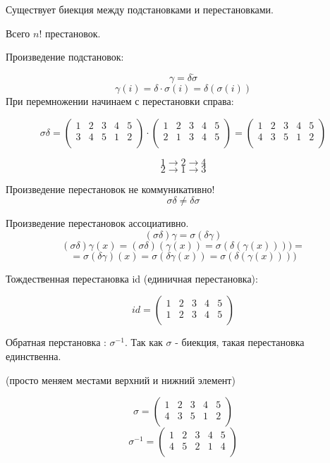 \documentclass[a4paper]{article}
\begin{document}
Существует биекция между подстановками и перестановками.

Всего $n!$ престановок.


Произведение подстановок:

$$ \gamma = \delta \dot \sigma$$
$$ \gamma(i) = \delta \cdot \sigma(i) = \delta ( \sigma(i))$$
При перемножении начинаем с перестановки справа:

\begin{equation*}
\sigma \delta= 
\begin{pmatrix}
	1 & 2 &3 & 4 & 5\\
	3 & 4 & 5 & 1 & 2\\	
\end{pmatrix}
\cdot
\begin{pmatrix}
	1 & 2 &3 & 4 & 5\\
	2 & 1 &3 & 4 & 5\\
\end{pmatrix}
=
\begin{pmatrix}
	1 & 2 &3 & 4 & 5\\
	4 & 3 & 5 & 1 & 2\\	
\end{pmatrix}
\end{equation*}

$$ 1 \to 2 \to 4$$
$$ 2 \to 1 \to 3$$

Произведение перестановок не коммуникативно!
$$ \sigma \delta \neq \delta \sigma $$

Произведение перестановок ассоциативно.
$$ (\sigma \delta) \gamma = \sigma (\delta \gamma)$$
$$ (\sigma \delta) \gamma(x) = (\sigma \delta) (\gamma(x)) = \sigma (\delta (\gamma(x))))= $$
$$ =\sigma (\delta \gamma)(x) = \sigma (\delta\gamma(x)) = \sigma (\delta (\gamma(x))))$$


Тождественная перестановка id (единичная перестановка):

\begin{equation*}
id= 
\begin{pmatrix}
	1 & 2 &3 & 4 & 5\\
	1 & 2 &3 & 4 & 5\\
\end{pmatrix}
\end{equation*}

Обратная перстановка : $\sigma^{-1}$. Так как $\sigma$ - биекция, такая перестановка единственна.

(просто меняем местами верхний и нижний элемент)


\begin{equation*}
\sigma= 
\begin{pmatrix}
	1 & 2 &3 & 4 & 5\\
	4 & 3 & 5 & 1 & 2\\	
\end{pmatrix}
\end{equation*}
\begin{equation*}
\sigma ^{-1}= 
\begin{pmatrix}
	1 & 2 &3 & 4 & 5\\
	4 & 5 & 2 & 1 & 4\\	
\end{pmatrix}
\end{equation*}
\end{document}
